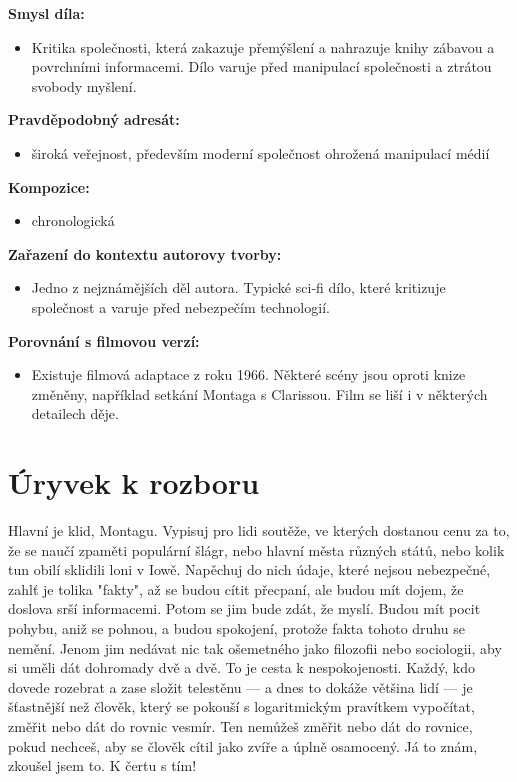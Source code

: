 \documentclass[12pt,a4paper]{article}
\begin{document}
\begin{tcolorbox}[breakable]
\textbf{Smysl díla:}
\begin{itemize}
\item Kritika společnosti, která zakazuje přemýšlení a nahrazuje knihy zábavou a povrchními informacemi. 
Dílo varuje před manipulací společnosti a ztrátou svobody myšlení.
\end{itemize}

\textbf{Pravděpodobný adresát:}
\begin{itemize}
\item široká veřejnost, především moderní společnost ohrožená manipulací médií
\end{itemize}

\textbf{Kompozice:}
\begin{itemize}
\item chronologická
\end{itemize}

\break

\textbf{Zařazení do kontextu autorovy tvorby:}
\begin{itemize}
\item Jedno z nejznámějších děl autora. Typické sci-fi dílo, které kritizuje společnost a varuje před nebezpečím technologií.
\end{itemize}

\textbf{Porovnání s filmovou verzí:}
\begin{itemize}
\item Existuje filmová adaptace z roku 1966. Některé scény jsou oproti knize změněny, například setkání Montaga s Clarissou. 
Film se liší i v některých detailech děje.
\end{itemize}

\end{tcolorbox}

\section*{Úryvek k rozboru}
Hlavní je klid, Montagu. Vypisuj pro
lidi soutěže, ve kterých dostanou cenu za to, že se naučí zpaměti populární šlágr, nebo hlavní města
různých států, nebo kolik tun obilí sklidili loni v Iowě. Napěchuj do nich údaje, které nejsou
nebezpečné, zahlť je tolika "fakty", až se budou cítit přecpaní, ale budou mít dojem, že doslova srší
informacemi. Potom se jim bude zdát, že myslí. Budou mít pocit pohybu, aniž se pohnou, a budou
spokojení, protože fakta tohoto druhu se nemění. Jenom jim nedávat nic tak ošemetného jako
filozofii nebo sociologii, aby si uměli dát dohromady dvě a dvě. To je cesta k nespokojenosti.
Každý, kdo dovede rozebrat a zase složit telestěnu — a dnes to dokáže většina lidí — je šťastnější
než člověk, který se pokouší s logaritmickým pravítkem vypočítat, změřit nebo dát do rovnic
vesmír. Ten nemůžeš změřit nebo dát do rovnice, pokud nechceš, aby se člověk cítil jako zvíře a
úplně osamocený. Já to znám, zkoušel jsem to. K čertu s tím!
\end{document}
